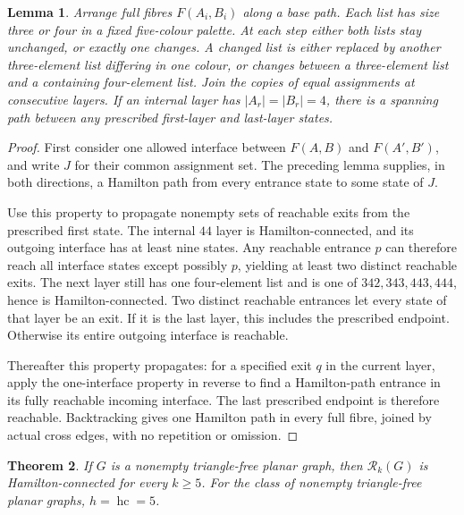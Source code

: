 \documentclass[11pt]{article}
\newtheorem{theorem}{Theorem}[section]
\newtheorem{lemma}[theorem]{Lemma}
\theoremstyle{remark}
\newcommand{\Rk}{\mathcal R_k}
\newcommand{\hc}{\operatorname{hc}}
\numberwithin{equation}{section}
\numberwithin{table}{section}
\begin{document}
\begin{lemma}
\label{lem:pair-five-reset}
Arrange full fibres $F(A_i,B_i)$ along a base path.  Each list has
size three or four in a fixed five-colour palette.  At each step either
both lists stay unchanged, or exactly one changes. A changed list
is either replaced by another three-element list differing in one
colour, or changes between a three-element list and a containing
four-element list.
Join the copies of equal assignments at consecutive layers.  If an
internal layer has $|A_r|=|B_r|=4$, there is a spanning path between
any prescribed first-layer and last-layer states.
\end{lemma}

\begin{proof}
First consider one allowed interface between $F(A,B)$ and $F(A',B')$,
and write $J$ for their common assignment set.  The preceding lemma
supplies, in both directions, a Hamilton path from every entrance state
to some state of $J$.

Use this property to propagate nonempty sets of reachable exits from
the prescribed first state.  The internal $44$ layer is
Hamilton-connected, and its outgoing interface has at least nine states.
Any reachable entrance $p$ can therefore reach all interface states
except possibly $p$, yielding at least two distinct reachable exits.
The next layer still has one four-element list and is one of
$342,343,443,444$, hence is Hamilton-connected.  Two distinct reachable
entrances let every state of that layer be an exit.  If it is the last
layer, this includes the prescribed endpoint.  Otherwise its entire
outgoing interface is reachable.

Thereafter this property propagates: for a specified exit $q$ in the
current layer, apply the one-interface property in reverse to find a
Hamilton-path entrance in its fully reachable incoming interface.
The last prescribed endpoint is therefore reachable.  Backtracking
gives one Hamilton path in every full fibre, joined by actual cross
edges, with no repetition or omission.
\end{proof}

\begin{theorem}
\label{thm:trianglefree-hc}
If $G$ is a nonempty triangle-free planar graph, then $\Rk(G)$ is
Hamilton-connected for every $k\ge5$.  For the class of nonempty
triangle-free planar graphs,
$h=\hc=5$.
\end{theorem}
\end{document}
